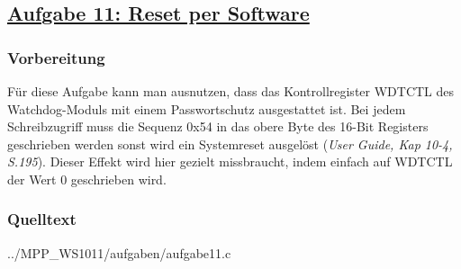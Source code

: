 \subsection*
{\href{http://cst.mi.fu-berlin.de/intern/19606-P-MPP/Aufgaben/040303.html}
{Aufgabe 11: Reset per Software}}

\subsubsection*{Vorbereitung}

Für diese Aufgabe kann man ausnutzen, dass das Kontrollregister WDTCTL
des Watchdog-Moduls mit einem Passwortschutz ausgestattet ist. Bei jedem
Schreibzugriff muss die Sequenz 0x54 in das obere Byte des 16-Bit
Registers geschrieben werden sonst wird ein Systemreset ausgelöst
({\it User Guide, Kap 10-4, S.195}). Dieser Effekt wird hier gezielt missbraucht,
indem einfach auf WDTCTL der Wert 0 geschrieben wird.

\subsubsection*{Quelltext}


{../MPP_WS1011/aufgaben/aufgabe11.c}
